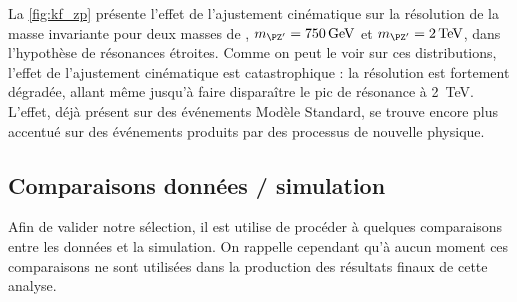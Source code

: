 La \cref{fig:kf_zp} présente l'effet de l'ajustement cinématique sur la résolution de la masse invariante pour deux masses de \zprime, $\mzp = \SI{750}{\GeV}$ et $\mzp = \SI{2}{\TeV}$, dans l'hypothèse de résonances étroites. Comme on peut le voir sur ces distributions, l'effet de l'ajustement cinématique est catastrophique : la résolution est fortement dégradée, allant même jusqu'à faire disparaître le pic de résonance à \SI{2}{\TeV}. L'effet, déjà présent sur des événements \ttbar Modèle Standard, se trouve encore plus accentué sur des événements \ttbar produits par des processus de nouvelle physique.

\subsection{Comparaisons données / simulation}

Afin de valider notre sélection, il est utilise de procéder à quelques comparaisons entre les données et la simulation. On rappelle cependant qu'à aucun moment ces comparaisons ne sont utilisées dans la production des résultats finaux de cette analyse.

\medskip

